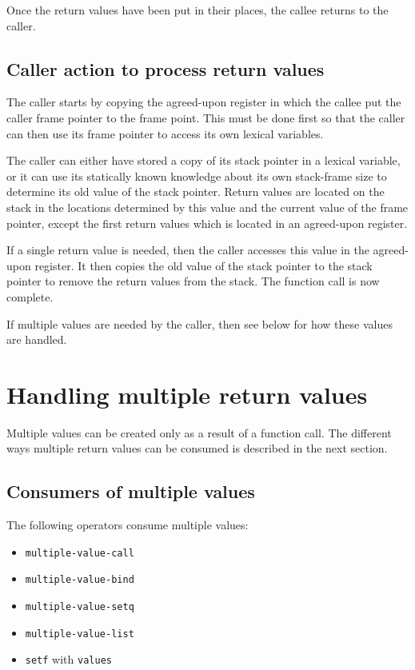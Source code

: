 Once the return values have been put in their places, the callee
returns to the caller.

\subsection{Caller action to process return values}

The caller starts by copying the agreed-upon register in which the
callee put the caller frame pointer to the frame point.  This must be
done first so that the caller can then use its frame pointer to access
its own lexical variables.

The caller can either have stored a copy of its stack pointer in a
lexical variable, or it can use its statically known knowledge about
its own stack-frame size to determine its old value of the stack
pointer.  Return values are located on the stack in the locations
determined by this value and the current value of the frame pointer,
except the first return values which is located in an agreed-upon
register.

If a single return value is needed, then the caller accesses this
value in the agreed-upon register.  It then copies the old value of
the stack pointer to the stack pointer to remove the return values
from the stack.  The function call is now complete.

If multiple values are needed by the caller, then see below for how
these values are handled.

\section{Handling multiple return values}

Multiple values can be created only as a result of a function call.
The different ways multiple return values can be consumed is described
in the next section.

\subsection{Consumers of multiple values}

The following operators consume multiple values:

\begin{itemize}
\item \texttt{multiple-value-call}
\item \texttt{multiple-value-bind}
\item \texttt{multiple-value-setq}
\item \texttt{multiple-value-list}
\item \texttt{setf} with \texttt{values}
\end{itemize}

